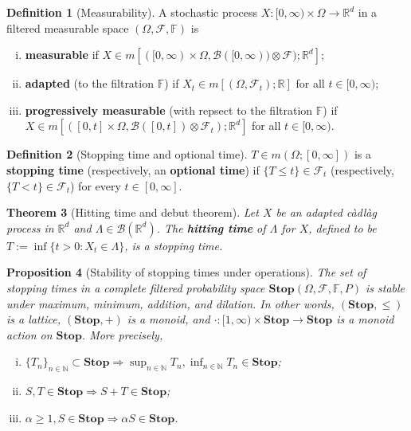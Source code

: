 \documentclass[openany,oneside]{book}
\newtheorem{thm}{Theorem}[section]
\newtheorem{prop}[thm]{Proposition}
\theoremstyle{definition}
\newtheorem{defn}[thm]{Definition}
\theoremstyle{remark}
\newcommand{\R}{{\mathbb R}}%
\begin{document}
\begin{defn}[Measurability]
A stochastic process $X:[0,\infty)\times\Omega \to \R^d$ in a filtered measurable space $(\Omega, \mathcal{F}, \mathbb{F})$ is
\begin{enumerate}[(i)]
\item \textbf{measurable} if $X\in m\left[([0,\infty) \times \Omega, \mathcal{B}([0,\infty)) \otimes \mathcal{F}); \R^d \right]$;
\item \textbf{adapted} (to the filtration $\mathbb{F}$) if $X_t\in m[(\Omega,\mathcal{F}_t);\R]$ for all $t\in[0,\infty)$;
\item \textbf{progressively measurable} (with repsect to the filtration $\mathbb{F}$) if $X\in m\left[([0,t] \times \Omega, \mathcal{B}([0,t]) \otimes \mathcal{F}_t); \R^d \right]$ for all $t\in[0,\infty)$.
\end{enumerate}
\end{defn}


\begin{defn}[Stopping time and optional time]
$T\in m(\Omega;[0,\infty])$ is a \textbf{stopping time} (respectively, an \textbf{optional time}) if $\{T\leq t\}\in\mathcal{F}_t$ (respectively, $\{T < t\}\in\mathcal{F}_t$) for every $t\in[0,\infty]$.
\end{defn}


\begin{thm}[Hitting time and debut theorem]
Let $X$ be an adapted c\`adl\`ag process in $\R^d$ and $\Lambda \in \mathcal{B}(\R^d)$. The \textbf{hitting time} of $\Lambda$ for $X$, defined to be $T:=\inf\{t>0 : X_t\in\Lambda\}$, is a stopping time.
\end{thm}


\begin{prop}[Stability of stopping times under operations]
The set of stopping times in a complete filtered probability space $\mathbf{Stop}(\Omega,\mathcal{F},\mathbb{F},P)$ is stable under maximum, minimum, addition, and dilation. In other words, $(\mathbf{Stop},\le)$ is a lattice, $(\mathbf{Stop},+)$ is a monoid, and $\cdot:[1,\infty)\times\mathbf{Stop} \to \mathbf{Stop}$ is a monoid action on $\mathbf{Stop}$. More precisely,
\begin{enumerate}[(i)]
\item $\{T_n\}_{n\in\mathbb{N}} \subset \mathbf{Stop} \Rightarrow \sup_{n\in\mathbb{N}} T_n, \inf_{n\in\mathbb{N}} T_n \in \mathbf{Stop}$;
\item $S,T\in \mathbf{Stop} \Rightarrow S+T \in \mathbf{Stop}$;
\item $\alpha \ge 1, S\in \mathbf{Stop} \Rightarrow \alpha S \in \mathbf{Stop}$.
\end{enumerate}
\end{prop}
\end{document}
